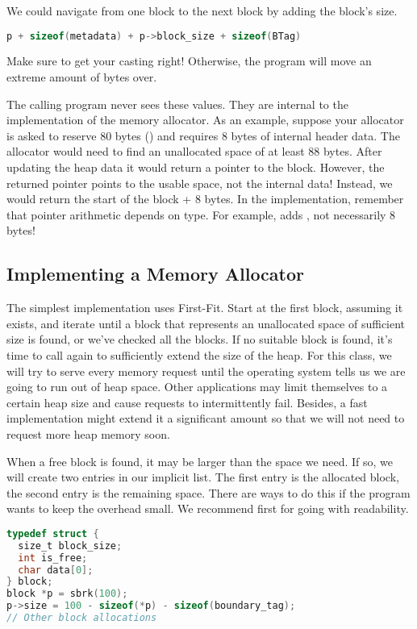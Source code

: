 We could navigate from one block to the next block by adding the block's size.

\begin{lstlisting}[language=C]
p + sizeof(metadata) + p->block_size + sizeof(BTag)
\end{lstlisting}

Make sure to get your casting right!
Otherwise, the program will move an extreme amount of bytes over.

The calling program never sees these values.
They are internal to the implementation of the memory allocator.
As an example, suppose your allocator is asked to reserve 80 bytes () and requires 8 bytes of internal header data.
The allocator would need to find an unallocated space of at least 88 bytes.
After updating the heap data it would return a pointer to the block.
However, the returned pointer points to the usable space, not the internal data!
Instead, we would return the start of the block + 8 bytes.
In the implementation, remember that pointer arithmetic depends on type. For example,  adds , not necessarily 8 bytes!

\subsection{Implementing a Memory Allocator}

The simplest implementation uses First-Fit.
Start at the first block, assuming it exists, and iterate until a block that represents an unallocated space of sufficient size is found, or we've checked all the blocks.
If no suitable block is found, it's time to call  again to sufficiently extend the size of the heap.
For this class, we will try to serve every memory request until the operating system tells us we are going to run out of heap space.
Other applications may limit themselves to a certain heap size and cause requests to intermittently fail.
Besides, a fast implementation might extend it a significant amount so that we will not need to request more heap memory soon.

When a free block is found, it may be larger than the space we need.
If so, we will create two entries in our implicit list.
The first entry is the allocated block, the second entry is the remaining space.
There are ways to do this if the program wants to keep the overhead small.
We recommend first for going with readability.

\begin{lstlisting}[language=C]
typedef struct {
  size_t block_size;
  int is_free;
  char data[0];
} block;
block *p = sbrk(100);
p->size = 100 - sizeof(*p) - sizeof(boundary_tag);
// Other block allocations
\end{lstlisting}

